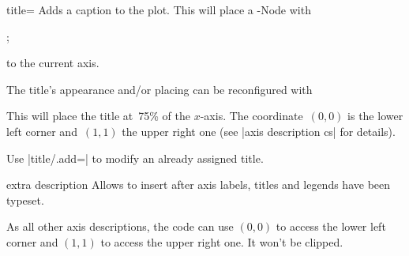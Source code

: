\begin{pgfplotskey}{title=}
Adds a caption to the plot. This will place a \Tikz-Node with
\begin{codeexample}
;
\end{codeexample}
to the current axis.
\begin{codeexample}[]
%
\end{codeexample}
% 
The title's appearance and/or placing can be reconfigured with
\begin{codeexample}
\end{codeexample}
This will place the title at~75\% of the $x$-axis. The coordinate~$(0,0)$ is the lower left corner and~$(1,1)$ the upper right one (see |axis description cs| for details).

Use |title/.add=| to modify an already assigned title.
\end{pgfplotskey}

\begin{pgfplotscodekey}{extra description}
Allows to insert  after axis labels, titles and legends have been typeset.

As all other axis descriptions, the code can use $(0,0)$ to access the lower left corner and $(1,1)$ to access the upper right one. It won't be clipped.
\begin{codeexample}[]
\end{codeexample}
\end{pgfplotscodekey}


